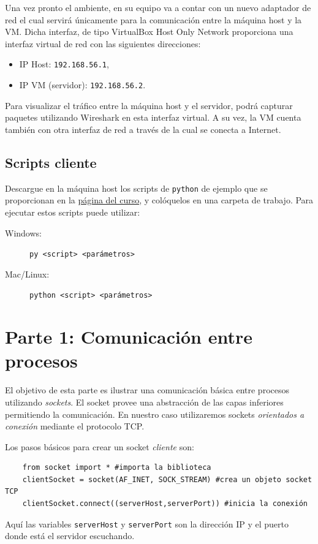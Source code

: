 \documentclass[a4paper,10pt]{article}
\begin{document}
Una vez pronto el ambiente, en su equipo va a contar con un nuevo adaptador de red el cual servirá únicamente para la comunicación entre la máquina host y la VM. Dicha interfaz, de tipo VirtualBox Host Only Network proporciona una interfaz virtual de red con las siguientes direcciones:
\begin{itemize}
    \item IP Host: \texttt{192.168.56.1},
    \item IP VM (servidor): \texttt{192.168.56.2}.
\end{itemize}
Para visualizar el tráfico entre la máquina host y el servidor, podrá capturar paquetes utilizando Wireshark en esta interfaz virtual. A su vez, la VM cuenta también con otra interfaz de red a través de la cual se conecta a Internet.

\subsection*{Scripts cliente}

Descargue en la máquina host los scripts de \texttt{python} de ejemplo que se proporcionan en la \href{https://aulas.ort.edu.uy/course/view.php?id=5210}{página del curso}, y colóquelos en una carpeta de trabajo. Para ejecutar estos scripts puede utilizar:
\begin{description}
    \item[Windows:] \texttt{py <script> <parámetros>}
    \item[Mac/Linux:] \texttt{python <script> <parámetros>}
\end{description}

\section*{Parte 1: Comunicación entre procesos}

El objetivo de esta parte es ilustrar una comunicación básica entre procesos utilizando \emph{sockets}. El socket provee una abstracción de las capas inferiores permitiendo la comunicación. En nuestro caso utilizaremos sockets \emph{orientados a conexión} mediante el protocolo TCP.

Los pasos básicos para crear un socket \emph{cliente} son:
\begin{verbatim}
    from socket import * #importa la biblioteca
    clientSocket = socket(AF_INET, SOCK_STREAM) #crea un objeto socket TCP
    clientSocket.connect((serverHost,serverPort)) #inicia la conexión
\end{verbatim}
Aquí las variables \texttt{serverHost} y \texttt{serverPort} son la dirección IP y el puerto donde está el servidor escuchando.
\end{document}
